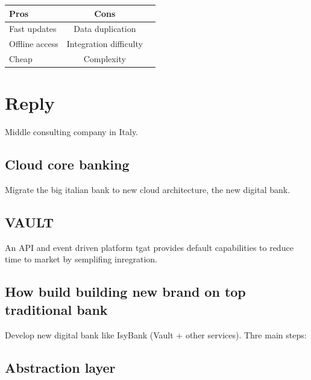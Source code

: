 \begin{table}[h!]
  \renewcommand{\arraystretch}{1.3}
  \centering
  \begin{tabular}{l c c}
    \toprule
    \textbf{Pros}  & \textbf{Cons}          \\
    \midrule
    Fast updates   & Data duplication       \\
    Offline access & Integration difficulty \\
    Cheap          & Complexity             \\
    \bottomrule
  \end{tabular}
\end{table}


\section{Reply}

Middle consulting company in Italy.

\subsection{Cloud core banking}

Migrate the big italian bank to new cloud architecture, the new digital bank.


\subsection{VAULT}

An API and event driven platform tgat provides default capabilities
to reduce time to market by semplifing inregration.

\subsection{How build building new brand on top traditional bank}

Develop new digital bank like IsyBank (Vault + other services).
Thre main steps:


\subsection{Abstraction layer}

